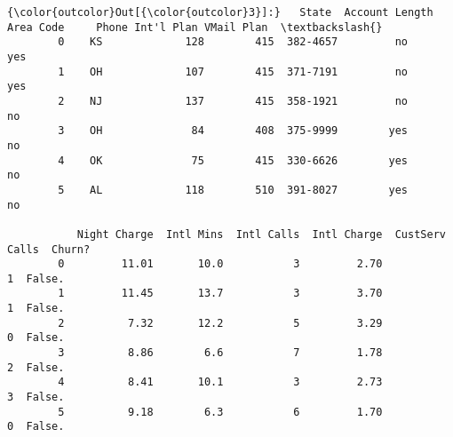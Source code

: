 \documentclass[11pt]{article}
\begin{document}
\begin{Verbatim}[commandchars=\\\{\}]
{\color{outcolor}Out[{\color{outcolor}3}]:}   State  Account Length  Area Code     Phone Int'l Plan VMail Plan  \textbackslash{}
        0    KS             128        415  382-4657         no        yes   
        1    OH             107        415  371-7191         no        yes   
        2    NJ             137        415  358-1921         no         no   
        3    OH              84        408  375-9999        yes         no   
        4    OK              75        415  330-6626        yes         no   
        5    AL             118        510  391-8027        yes         no   
        
           Night Charge  Intl Mins  Intl Calls  Intl Charge  CustServ Calls  Churn?  
        0         11.01       10.0           3         2.70               1  False.  
        1         11.45       13.7           3         3.70               1  False.  
        2          7.32       12.2           5         3.29               0  False.  
        3          8.86        6.6           7         1.78               2  False.  
        4          8.41       10.1           3         2.73               3  False.  
        5          9.18        6.3           6         1.70               0  False.  
\end{Verbatim}
            
\end{document}
